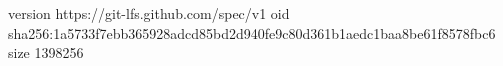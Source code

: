 version https://git-lfs.github.com/spec/v1
oid sha256:1a5733f7ebb365928adcd85bd2d940fe9c80d361b1aedc1baa8be61f8578fbc6
size 1398256
